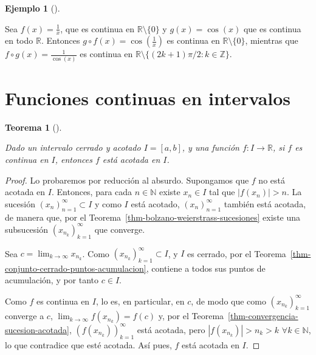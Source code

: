 \documentclass[
  a4paper,
]{scrreport}
\theoremstyle{definition}
\newtheorem{example}{Ejemplo}[chapter]
\theoremstyle{plain}
\theoremstyle{definition}
\theoremstyle{definition}
\theoremstyle{plain}
\newtheorem{theorem}{Teorema}[chapter]
\theoremstyle{plain}
\theoremstyle{remark}
\begin{document}
\begin{example}[]\protect\hypertarget{exm-continuidad-composicion-funciones}{}\label{exm-continuidad-composicion-funciones}

Sea \(f(x)=\frac{1}{x}\), que es continua en
\(\mathbb{R}\setminus\{0\}\) y \(g(x)=\cos(x)\) que es continua en todo
\(\mathbb{R}\). Entonces \(g\circ f(x)=\cos\left(\frac{1}{x}\right)\) es
continua en \(\mathbb{R}\setminus\{0\}\), mientras que
\(f\circ g(x)=\frac{1}{\cos(x)}\) es continua en
\(\mathbb{R}\setminus\{(2k+1)\pi/2: k\in\mathbb{Z}\}\).

\end{example}

\section{Funciones continuas en
intervalos}\label{funciones-continuas-en-intervalos}

\begin{theorem}[]\protect\hypertarget{thm-funcion-continua-intervalo-cerrado}{}\label{thm-funcion-continua-intervalo-cerrado}

Dado un intervalo cerrado y acotado \(I=[a,b]\), y una función
\(f:I\to\mathbb{R}\), si \(f\) es continua en \(I\), entonces \(f\) está
acotada en \(I\).

\end{theorem}

\begin{tcolorbox}[enhanced jigsaw, leftrule=.75mm, colbacktitle=quarto-callout-note-color!10!white, toprule=.15mm, opacityback=0, opacitybacktitle=0.6, toptitle=1mm, breakable, bottomtitle=1mm, colframe=quarto-callout-note-color-frame, rightrule=.15mm, titlerule=0mm, title=\textcolor{quarto-callout-note-color}{\faInfo}\hspace{0.5em}{Demostración}, arc=.35mm, left=2mm, bottomrule=.15mm, colback=white, coltitle=black]

\begin{proof}
Lo probaremos por reducción al absurdo. Supongamos que \(f\) no está
acotada en \(I\). Entonces, para cada \(n\in\mathbb{N}\) existe
\(x_n\in I\) tal que \(|f(x_n)|>n\). La sucesión
\((x_n)_{n=1}^\infty\subset I\) y como \(I\) está acotado,
\((x_n)_{n=1}^\infty\) también está acotada, de manera que, por el
Teorema~\ref{thm-bolzano-weierstrass-sucesiones} existe una subsucesión
\((x_{n_k})_{k=1}^\infty\) que converge.

Sea \(c=\lim_{k\to\infty}x_{n_k}\). Como
\((x_{n_k})_{k=1}^\infty\subset I\), y \(I\) es cerrado, por el
Teorema~\ref{thm-conjunto-cerrado-puntos-acumulacion}, contiene a todos
sus puntos de acumulación, y por tanto \(c\in I\).

Como \(f\) es continua en \(I\), lo es, en particular, en \(c\), de modo
que como \((x_{n_k})_{k=1}^\infty\) converge a \(c\),
\(\lim_{k\to\infty}f(x_{n_k}) = f(c)\) y, por el
Teorema~\ref{thm-convergencia-sucesion-acotada},
\((f(x_{n_k}))_{k=1}^\infty\) está acotada, pero \(|f(x_{n_k})|>n_k>k\)
\(\forall k\in\mathbb{N}\), lo que contradice que esté acotada. Así
pues, \(f\) está acotada en \(I\).
\end{proof}

\end{tcolorbox}
\end{document}
